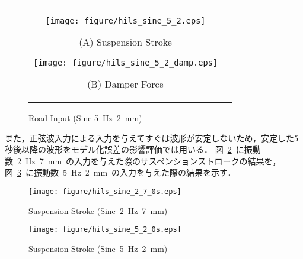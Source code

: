 \documentclass[a4paper,12pt]{article_vdlab_sotsuron}
\begin{document}
\vspace{10mm}
\begin{figure}[h]
    \begin{tabular}{cc}
      \begin{minipage}{0.45\hsize}
	\centering
	  \texttt{[image: figure/hils\_sine\_5\_2.eps]}
	  \begin{center}
	  \vspace{2mm}
	  \ (A) Suspension Stroke\
	  \end{center}
	\end{minipage}
       \begin{minipage}{0.5\hsize}
	\centering
	  \texttt{[image: figure/hils\_sine\_5\_2\_damp.eps]}
	  \begin{center}
	  \vspace{2mm}
	  \ (B) Damper Force\
	  \end{center}
      \end{minipage}
    \end{tabular}
    \vspace{2mm}
    \caption{Road Input (Sine 5~Hz~2~mm)}
    \label{fig:sine_5}
\end{figure}

\newpage
また，正弦波入力による入力を与えてすぐは波形が安定しないため，安定した5秒後以降の波形をモデル化誤差の影響評価では用いる．
図~\ref{fig:sine2_0}~に振動数~2~Hz~7~mm~の入力を与えた際のサスペンションストロークの結果を，図~\ref{fig:sine5_0}~に振動数~5~Hz~2~mm~の入力を与えた際の結果を示す．

\vspace{15mm}
\begin{figure}[h]
  \centering
   \texttt{[image: figure/hils\_sine\_2\_7\_0s.eps]}
  \vspace{2mm}
\caption{Suspension Stroke (Sine~2~Hz~7~mm)}
  \label{fig:sine2_0}
\end{figure}

\vspace{15mm}
\begin{figure}[h]
  \centering
   \texttt{[image: figure/hils\_sine\_5\_2\_0s.eps]}
  \vspace{2mm}
\caption{Suspension Stroke (Sine~5~Hz~2~mm)}
  \label{fig:sine5_0}
\end{figure}
\end{document}
